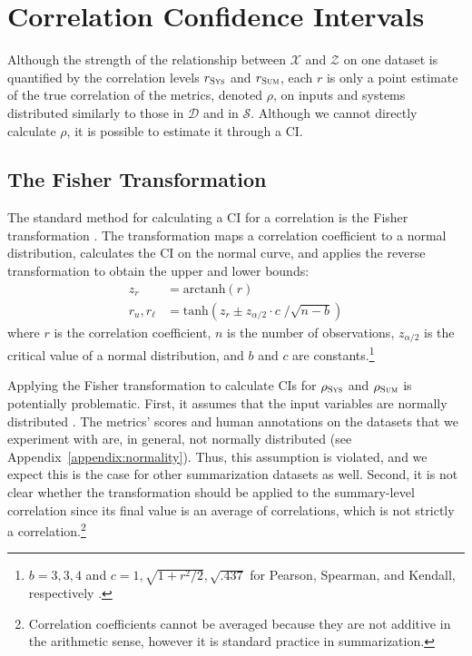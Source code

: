 \section{Correlation Confidence Intervals}
\label{sec:ci}
Although the strength of the relationship between $\mathcal{X}$ and $\mathcal{Z}$ on one dataset is quantified by the correlation levels $r_\textsc{Sys}$ and $r_\textsc{Sum}$, each $r$ is only a point estimate of the true correlation of the metrics, denoted $\rho$, on inputs and systems distributed similarly to those in $\mathcal{D}$ and in $\mathcal{S}$.
Although we cannot directly calculate $\rho$, it is possible to estimate it through a CI.

\subsection{The Fisher Transformation}
\label{sec:fisher}
The standard method for calculating a CI for a correlation is the Fisher transformation \citep{Fisher92}.
The transformation maps a correlation coefficient to a normal distribution, calculates the CI on the normal curve, and applies the reverse transformation to obtain the upper and lower bounds:
\begin{align*}
    z_r &= \textrm{arctanh}(r) \\
    r_u, r_\ell &= \textrm{tanh}\left(z_r \pm  z_{\alpha/2} \cdot c\; / \sqrt{n-b}\right)
\end{align*}
where $r$ is the correlation coefficient, $n$ is the number of observations, $z_{\alpha/2}$ is the critical value of a normal distribution, and $b$ and $c$ are constants.\footnote{
$b=3, 3, 4$ and $c=1, \sqrt{1+r^2/2}, \sqrt{.437}$ for Pearson, Spearman, and Kendall, respectively \citep{BonettWr00}.
}

Applying the Fisher transformation to calculate CIs for $\rho_\textsc{Sys}$ and $\rho_\textsc{Sum}$ is potentially problematic.
First, it assumes that the input variables are normally distributed \citep{BonettWr00}.
The metrics' scores and human annotations on the datasets that we experiment with are, in general, not normally distributed (see Appendix~\ref{appendix:normality}).
Thus, this assumption is violated, and we expect this is the case for other summarization datasets as well.
Second, it is not clear whether the transformation should be applied to the summary-level correlation since its final value is an average of correlations, which is not strictly a correlation.\footnote{
Correlation coefficients cannot be averaged because they are not additive in the arithmetic sense, however it is standard practice in summarization.
}

